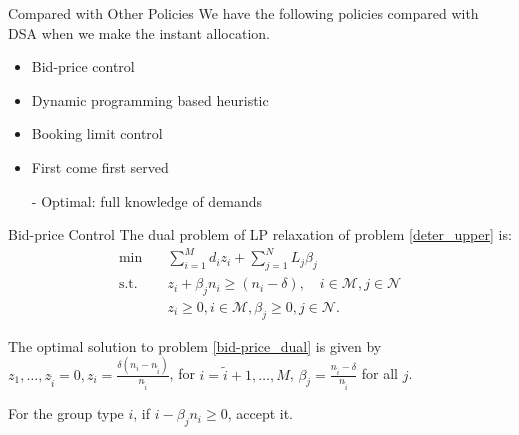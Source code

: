     \begin{frame}{Compared with Other Policies}
      We have the following policies compared with DSA when we make the instant allocation.
      
      \vspace{0.5cm}
      
      \begin{itemize}
        \item Bid-price control
        \item Dynamic programming based heuristic
        \item Booking limit control
        \item First come first served
        \item[-] Optimal: full knowledge of demands
      \end{itemize}
    \end{frame}

      \begin{frame}{Bid-price Control}
        The dual problem of LP relaxation of problem \eqref{deter_upper} is:
        \begin{equation}\label{bid-price_dual}
          \begin{aligned}
          \min \quad & \sum_{i=1}^{M} d_i z_i + \sum_{j= 1}^{N} L_j \beta_{j} \\
          \text {s.t.} \quad & z_{i} + \beta_j n_i \geq (n_i-\delta), \quad i \in \mathcal{M}, j \in \mathcal{N} \\
          & z_{i} \geq 0, i \in \mathcal{M}, \beta_{j} \geq 0, j \in \mathcal{N}.
          \end{aligned}
        \end{equation}
        
        \small
        
        The optimal solution to problem \eqref{bid-price_dual} is given by $z_1, \ldots, z_{\tilde{i}} =0, z_i = \frac{\delta (n_i - n_{\tilde{i}})}{n_{\tilde{i}}}$, for $i = \tilde{i} + 1, \ldots, M$, $\beta_j = \frac{n_{\tilde{i}} - \delta}{n_{\tilde{i}}}$ for all $j$.
        \vspace{0.5cm}

        For the group type $i$, if $i - \beta_j n_i \geq 0$, accept it. 
      \end{frame}

